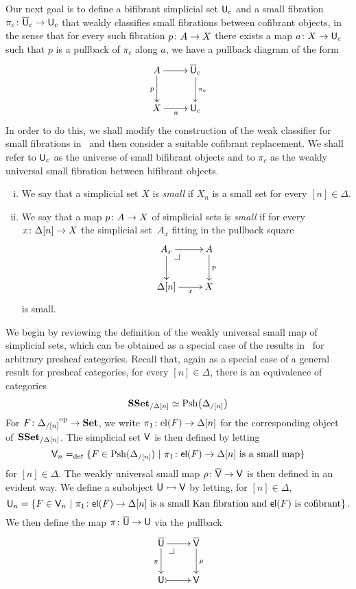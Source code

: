 \documentclass[reqno,10pt,a4paper,oneside,draft]{amsart}
\begin{document}
Our next goal is to define a bifibrant simplicial set $\mathsf{U}_c$ and a small fibration $\pi_c \colon \overline{\mathsf{U}}_c \to \mathsf{U}_c$ that weakly classifies small fibrations between cofibrant objects, in the sense that for every such fibration $p \colon A \to X$ there exists a map $a \colon X \to \mathsf{U}_c$ such that $p$ is a pullback of $\pi_c$ along $a$, \ie we have a pullback diagram of the form
\[
\xymatrix{
A \ar[r] \ar[d]_p   & \UU_c \ar[d]^{\pi_c} \\
X \ar[r]_a &  \U_c }
\]
In order to do this, we shall modify  the construction of the weak classifier for small fibrations 
in~\cite{voevodsky-simplicial-model} and then consider a suitable cofibrant replacement. 
We shall refer to $\mathsf{U}_c$ as the universe of small bifibrant objects and to $\pi_c$ as the 
weakly universal small fibration between bifibrant objects.

\begin{definition} \hfill 
\label{thm:small}
\begin{enumerate}[(i)]
\item We say that a simplicial set $X$ is \emph{small}  if $X_n$ is a small set for every $[n] \in \Delta$. 
\item We say that a map $p \colon A \to X$ of simplicial sets is \emph{small} if for every $x \colon \Delta[n] 
\to X$ the simplicial set~$A_x$ fitting in the pullback square
\[
\xymatrix{
A_x \ar[r] \ar[d] \drpullback & A \ar[d]^{p} \\
\Delta[n] \ar[r]_-{x} & X }
\]
is small.
\end{enumerate}
\end{definition} 

\bigskip



\medskip

We begin by reviewing the definition of the weakly universal small map of simplicial sets, which
can be obtained as a special case of the results in~\cite{hofmann-streicher-universes} for arbitrary presheaf
categories. Recall that, again as a special case of a general result for presheaf categories, for every $[n] \in \Delta$, there is an equivalence of categories
\begin{equation}
\label{equ:pshslice}
\mathbf{SSet}_{/\Delta[n]} \simeq \mathrm{Psh} \big( \Delta_{/[n]} \big )
\end{equation}
For $F \colon {\Delta_{/[n]}}^{\operatorname{op}} \to \mathbf{Set}$, we write $\pi_1 \colon \mathrm{el}(F) \to \Delta[n]$
for the corresponding object of~$\mathbf{SSet}_{/\Delta[n]}$. The simplicial set $\mathsf{V}$ is then defined by letting
\[
\mathsf{V}_n =_{\operatorname{def}} \{ F \in \mathrm{Psh}(\Delta_{/[n]}) \ | \ \pi_1 \colon \mathsf{el}(F) \to \Delta[n] \text{ is a small
map} \}
\]
for $[n] \in \Delta$. The weakly universal small map $\rho \colon \overline{\mathsf{V}} \to \mathsf{V}$ is then defined in an evident way. 
We define a subobject $\mathsf{U} \rightarrowtail \mathsf{V}$ by letting, for $[n] \in \Delta$, 
\[
\mathsf{U}_n = \{ F \in \mathsf{V}_n \ | \ \pi_1 \colon \mathsf{el}(F) \to \Delta[n] \text{ is a small Kan fibration and $\mathsf{el}(F)$ is cofibrant} \} \, .
\]
We then define the map $\pi \colon \overline{\mathsf{U}} \to \mathsf{U}$ via the pullback 
\[
\xymatrix{
\UU \ar[r] \ar[d]_\pi \drpullback  & \VV \ar[d]^\rho \\
\U \ar@{>->}[r] & \V }
\]
\end{document}
